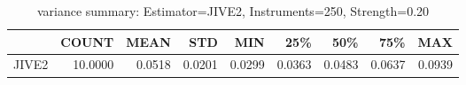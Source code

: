 \begin{table}[ht]
\centering
\caption{variance summary: Estimator=JIVE2, Instruments=250, Strength=0.20}
\begin{tabular}{lrrrrrrrr}
\toprule
 & COUNT & MEAN & STD & MIN & 25\% & 50\% & 75\% & MAX \\
\midrule
JIVE2 & 10.0000 & 0.0518 & 0.0201 & 0.0299 & 0.0363 & 0.0483 & 0.0637 & 0.0939 \\
\bottomrule
\end{tabular}
\end{table}
